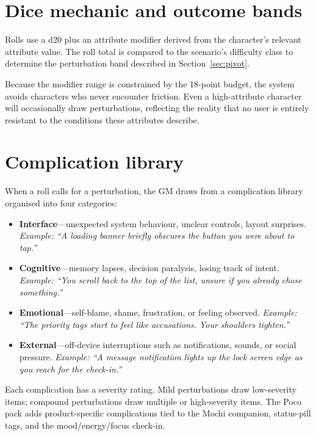 \documentclass[12pt,a4paper]{report}
\begin{document}
\section{Dice mechanic and outcome bands}

Rolls use a d20 plus an attribute modifier derived from the character's relevant
attribute value.
The roll total is compared to the scenario's difficulty class to determine the
perturbation band described in Section~\ref{sec:pivot}.

Because the modifier range is constrained by the 18-point budget, the system avoids
characters who never encounter friction.
Even a high-attribute character will occasionally draw perturbations, reflecting the
reality that no user is entirely resistant to the conditions these attributes describe.

\section{Complication library}

When a roll calls for a perturbation, the GM draws from a complication library organised
into four categories:

\begin{itemize}
  \item \textbf{Interface}---unexpected system behaviour, unclear controls, layout
        surprises.
        \textit{Example: ``A loading banner briefly obscures the button you were about
        to tap.''}
  \item \textbf{Cognitive}---memory lapses, decision paralysis, losing track of intent.
        \textit{Example: ``You scroll back to the top of the list, unsure if you already
        chose something.''}
  \item \textbf{Emotional}---self-blame, shame, frustration, or feeling observed.
        \textit{Example: ``The priority tags start to feel like accusations. Your
        shoulders tighten.''}
  \item \textbf{External}---off-device interruptions such as notifications, sounds, or
        social pressure.
        \textit{Example: ``A message notification lights up the lock screen edge as you
        reach for the check-in.''}
\end{itemize}

Each complication has a severity rating.
Mild perturbations draw low-severity items; compound perturbations draw multiple or
high-severity items.
The Poco pack adds product-specific complications tied to the Mochi companion, status-pill
tags, and the mood/energy/focus check-in.
\end{document}
